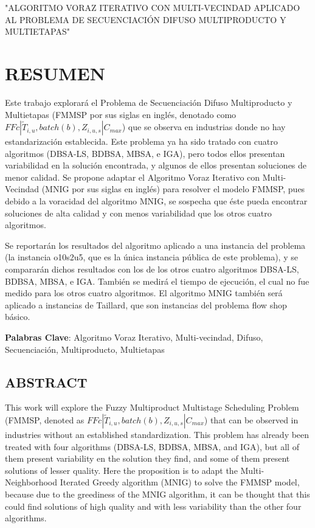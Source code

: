 \documentclass{article}
\def\notac_modelo{$FFc | \tilde{T}_{i, u}, batch(b), Z_{i, u, s} | C_{max}$}
\begin{document}
"ALGORITMO VORAZ ITERATIVO CON MULTI-VECINDAD APLICADO AL PROBLEMA DE SECUENCIACIÓN DIFUSO MULTIPRODUCTO Y \linebreak MULTIETAPAS"

\newpage

\section{RESUMEN}

Este trabajo explorará el Problema de Secuenciación Difuso Multiproducto y Multietapas (FMMSP por sus siglas en inglés, denotado como \notac_modelo) que se observa en industrias donde no hay estandarización establecida. Este problema ya ha sido tratado con cuatro algoritmos (DBSA-LS, BDBSA, MBSA, e IGA), pero todos ellos presentan variabilidad en la solución encontrada, y algunos de ellos presentan soluciones de menor calidad. Se propone adaptar el Algoritmo Voraz Iterativo con Multi-Vecindad (MNIG por sus siglas en inglés) para resolver el modelo FMMSP, pues debido a la voracidad del algoritmo MNIG, se sospecha que éste pueda encontrar soluciones de alta calidad y con menos variabilidad que los otros cuatro algoritmos.

\vspace{\baselineskip}
Se reportarán los resultados del algoritmo aplicado a una instancia del problema (la instancia o10s2u5, que es la única instancia pública de este problema), y se compararán dichos resultados con los de los otros cuatro algoritmos DBSA-LS, BDBSA, MBSA, e IGA. También se medirá el tiempo de ejecución, el cual no fue medido para los otros cuatro algoritmos. El algoritmo MNIG también será aplicado a instancias de Taillard, que son instancias del problema flow shop básico.

\vspace{\baselineskip}
\textbf{Palabras Clave}: Algoritmo Voraz Iterativo, Multi-vecindad, Difuso, Secuenciación, Multiproducto, Multietapas

\subsection{ABSTRACT}

This work will explore the Fuzzy Multiproduct Multistage Scheduling Problem (FMMSP, denoted as \notac_modelo) that can be observed in industries without an established standardization. This problem has already been treated with four algorithms (DBSA-LS, BDBSA, MBSA, and IGA), but all of them present variability en the solution they find, and some of them present solutions of lesser quality. Here the proposition is to adapt the Multi-Neighborhood Iterated Greedy algorithm (MNIG) to solve the FMMSP model, because due to the greediness of the MNIG algorithm, it can be thought that this could find solutions of high quality and with less variability than the other four algorithms.
\end{document}
